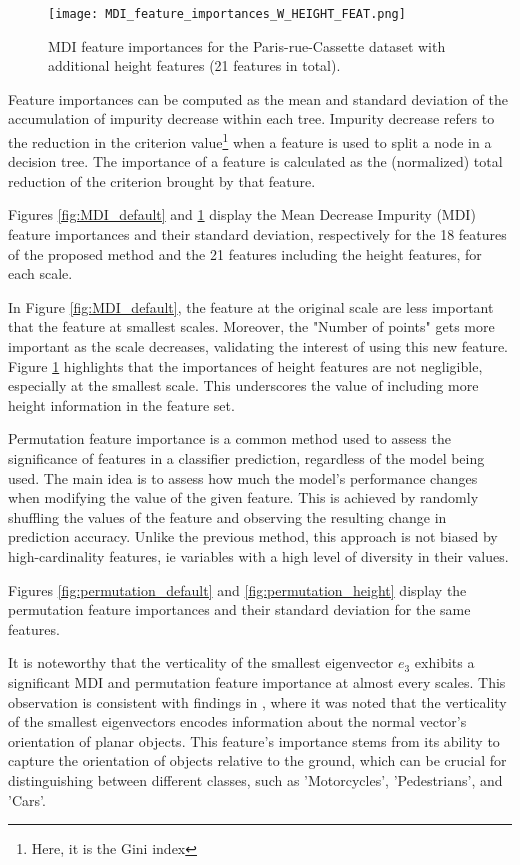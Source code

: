 \documentclass{article}
\begin{document}
\begin{figure}
    \hspace*{-2cm}
        \texttt{[image: MDI\_feature\_importances\_W\_HEIGHT\_FEAT.png]}
    \caption{MDI feature importances for the Paris-rue-Cassette dataset with additional height features (21 features in total).}
    \label{fig:MDI_height}
\end{figure}

Feature importances can be computed as the mean and standard deviation of the accumulation of impurity decrease within each tree. Impurity decrease refers to the reduction in the criterion value\footnote{Here, it is the Gini index} when a feature is used to split a node in a decision tree. The importance of a feature is calculated as the (normalized) total reduction of the criterion brought by that feature.

Figures \ref{fig:MDI_default} and \ref{fig:MDI_height} display the Mean Decrease Impurity (MDI) feature importances and their standard deviation, respectively for the 18 features of the proposed method \cite{thomas_semantic_2018} and the 21 features including the height features, for each scale. 

In Figure \ref{fig:MDI_default}, the feature at the original scale are less important that the feature at smallest scales. Moreover, the "Number of points" gets more important as the scale decreases, validating the interest of using this new feature. Figure \ref{fig:MDI_height} highlights that the importances of height features are not negligible, especially at the smallest scale. This underscores the value of including more height information in the feature set. 


Permutation feature importance is a common method used to assess the significance of features in a classifier prediction, regardless of the model being used. The main idea is to assess how much the model's performance changes when modifying the value of the given feature. This is achieved by randomly shuffling the values of the feature and observing the resulting change in prediction accuracy.
Unlike the previous method, this approach is not biased by high-cardinality features, ie variables with a high level of diversity in their values.

Figures \ref{fig:permutation_default} and \ref{fig:permutation_height} display the permutation feature importances and their standard deviation for the same features. 

It is noteworthy that the verticality of the smallest eigenvector $e_3$ exhibits a significant MDI and permutation feature importance at almost every scales. This observation is consistent with findings in \cite{thomas_semantic_2018}, where it was noted that the verticality of the smallest eigenvectors encodes information about the normal vector's orientation of planar objects. This feature's importance stems from its ability to capture the orientation of objects relative to the ground, which can be crucial for distinguishing between different classes, such as 'Motorcycles', 'Pedestrians', and 'Cars'.
\end{document}

